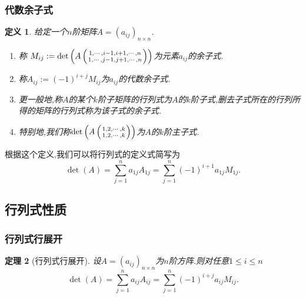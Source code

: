 \documentclass{article}
\newtheorem{theorem}{定理}  %
\newtheorem{definition}[theorem]{定义}
\renewcommand{\blue }[1]{{\textcolor[rgb]{0,0,1}{#1}}}
\begin{document}
\subsubsection{代数余子式}
\begin{definition}
给定一个$n$阶矩阵$A=(a_{ij})_{n\times n}$.
\begin{enumerate}
\item 称 $M_{ij}:=\det\left(A\left({{1,\cdots,i-1,i+1,\cdots,n}\atop{1,\cdots,j-1,j+1,\cdots,n}}\right)\right)$为元素$a_{ij}$的\blue{余子式}.
\item 称$A_{ij}:=(-1)^{i+j}M_{ij}$为$a_{ij}$的\blue{代数余子式}.
\item 更一般地,称$A$的某个$k$阶子矩阵的行列式为$A$的\blue{$k$阶子式},删去子式所在的行列所得的矩阵的行列式称为该子式的\blue{余子式}.
\item 特别地,我们称$\det\left(A\left({{1,2,\cdots,k}\atop{1,2,\cdots,k}}\right)\right)$为$A$的\blue{$k$阶主子式}.
\end{enumerate}
\end{definition}
根据这个定义,我们可以将行列式的定义式简写为
\[\boxed{\det(A)=\sum_{j=1}^na_{1j}A_{1j} = \sum_{j=1}^{n}(-1)^{i+1}a_{1j}M_{1j}.}\]


\subsection{行列式性质}

\subsubsection{行列式行展开}
\begin{theorem}[行列式行展开]
设$A=(a_{ij})_{n\times n}$为$n$阶方阵.则对任意$1\leq i \leq n$
\[\boxed{\det(A)=\sum_{j=1}^na_{ij}A_{ij} = \sum_{j=1}^{n}(-1)^{i+j}a_{ij}M_{ij}.}\]
\end{theorem}
\end{document}
